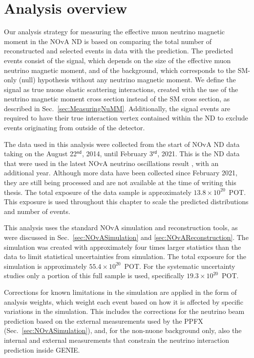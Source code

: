 \section{Analysis overview}\label{sec:NuMMAnalysisOverview}

Our analysis strategy for measuring the effective muon neutrino magnetic moment in the \gls{NOvA} \gls{ND} is based on comparing the total number of reconstructed and selected events in data with the prediction. The predicted events consist of the signal, which depends on the size of the effective muon neutrino magnetic moment, and of the background, which corresponds to the \gls{SM}-only (null) hypothesis without any neutrino magnetic moment. We define the signal as true \gls{nuone} elastic scattering interactions, created with the use of the neutrino magnetic moment cross section instead of the \gls{SM} cross section, as described in Sec.~\ref{sec:MeasuringNuMM}. Additionally, the signal events are required to have their true interaction vertex contained within the \gls{ND} to exclude events originating from outside of the detector.

The data used in this analysis were collected from the start of \gls{NOvA} \gls{ND} data taking on the August 22$^{\textsf{nd}}$, 2014, until February 3$^{\textsf{rd}}$, 2021. This is the \gls{ND} data that were used in the latest \gls{NOvA} neutrino oscillations result \cite{NOvAResults2021.pdf}, with an additional year. Although more data have been collected since February 2021, they are still being processed and are not available at the time of writing this thesis. The total exposure of the data sample is approximately $13.8\times10^{20}$~\gls{POT}. This exposure is used throughout this chapter to scale the predicted distributions and number of events.

This analysis uses the standard \gls{NOvA} simulation and reconstruction tools, as were discussed in Sec.~\ref{sec:NOvASimulation} and \ref{sec:NOvAReconstruction}. The simulation was created with approximately four times larger statistics than the data to limit statistical uncertainties from simulation. The total exposure for the simulation is approximately $55.4\times10^{20}$~\gls{POT}. For the systematic uncertainty studies only a portion of this full sample is used, specifically $19.3\times10^{20}$~\gls{POT}.

Corrections for known limitations in the simulation are applied in the form of analysis weights, which weight each event based on how it is affected by specific variations in the simulation. This includes the corrections for the neutrino beam prediction based on the external measurements used by the \gls{PPFX} (Sec.~\ref{sec:NOvASimulation}), and, for the non-\gls{nuone} background only, also the internal and external measurements that constrain the neutrino interaction prediction inside GENIE.

